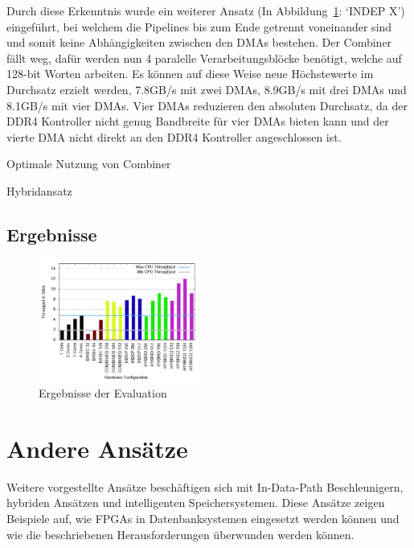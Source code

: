 \documentclass[conference]{IEEEtran}
\begin{document}
Durch diese Erkenntnis wurde ein weiterer Ansatz (In Abbildung~\ref{fig:eval}: `INDEP X') eingeführt, bei welchem die Pipelines bis zum Ende getrennt voneinander sind und somit keine Abhängigkeiten zwischen den DMAs bestehen.
Der Combiner fällt weg, dafür werden nun 4 paralelle Verarbeitungsblöcke benötigt, welche auf 128-bit Worten arbeiten. Es können auf diese Weise neue Höchstewerte im Durchsatz erzielt werden,
7.8GB/s mit zwei DMAs, 8.9GB/s mit drei DMAs und 8.1GB/s mit vier DMAs. Vier DMAs reduzieren den absoluten Durchsatz, da der DDR4 Kontroller nicht genug Bandbreite für vier DMAs bieten kann und der
vierte DMA nicht direkt an den DDR4 Kontroller angeschlossen ist.


Optimale Nutzung von Combiner

Hybridansatz



\subsection{Ergebnisse}


\begin{figure}[htbp]

    \includegraphics[width=0.47\textwidth]{imgs/eval.png}
    \caption{Ergebnisse der Evaluation~\cite{lisa_column_2018}}
    \label{fig:eval}
\end{figure}


\section{Andere Ansätze}
Weitere vorgestellte Ansätze beschäftigen sich mit In-Data-Path Beschleunigern, hybriden Ansätzen und intelligenten Speichersystemen. Diese Ansätze
zeigen Beispiele auf, wie FPGAs in Datenbanksystemen eingesetzt werden können und wie die beschriebenen Herausforderungen überwunden werden können.
\end{document}
